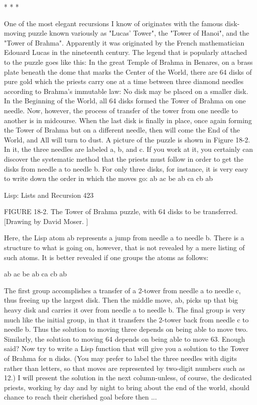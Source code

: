                                         *   *   *

        One of the most elegant recursions I know of originates with the famous disk-
moving puzzle known variously as "Lucas' Tower", the "Tower of Hanoi", and the
"Tower of Brahma". Apparently it was originated by the French mathematician
Edouard Lucas in the nineteenth century. The legend that is popularly attached to the
puzzle goes like this:
        In the great Temple of Brahma in Benares, on a brass plate beneath the dome
that marks the Center of the World, there are 64 disks of pure gold which the priests
carry one at a time between three diamond needles according to Brahma's immutable
law: No disk may be placed on a smaller disk. In the Beginning of the World, all 64
disks formed the Tower of Brahma on one needle. Now, however, the process of
transfer of the tower from one needle to another is in midcourse. When the last disk is
finally in place, once again forming the Tower of Brahma but on a different needle,
then will come the End
        of the World, and All will turn to dust.
        A picture of the puzzle is shown in Figure 18-2. In it, the three needles are
labeled a, b, and c.
        If you work at it, you certainly can discover the systematic method that the
priests must follow in order to get the disks from needle a to needle b. For only three
disks, for instance, it is very easy to write down the order in which the moves go:
                ab ac be ab ca cb ab




Lisp: Lists and Recursion                                                             423

FIGURE 18-2. The Tower of Brahma puzzle, with 64 disks to be transferred.
[Drawing by David Moser. ]

Here, the Lisp atom ab represents a jump from needle a to needle b. There is a
structure to what is going on, however, that is not revealed by a mere listing of such
atoms. It is better revealed if one groups the atoms as follows:

               ab ac be ab ca cb ab

         The first group accomplishes a transfer of a 2-tower from needle a to needle c,
thus freeing up the largest disk. Then the middle move, ab, picks up that big heavy
disk and carries it over from needle a to needle b. The final group is very much like
the initial group, in that it transfers the 2-tower back from needle c to needle b. Thus
the solution to moving three depends on being able to move two. Similarly, the
solution to moving 64 depends on being able to move 63. Enough said? Now try to
write a Lisp function that will give you a solution to the Tower of Brahma for n disks.
(You may prefer to label the three needles with digits rather than letters, so that moves
are represented by two-digit numbers such as 12.) I will present the solution in the
next column-unless, of course, the dedicated priests, working by day and by night to
bring about the end of the world, should chance to reach their cherished goal before
then ...




